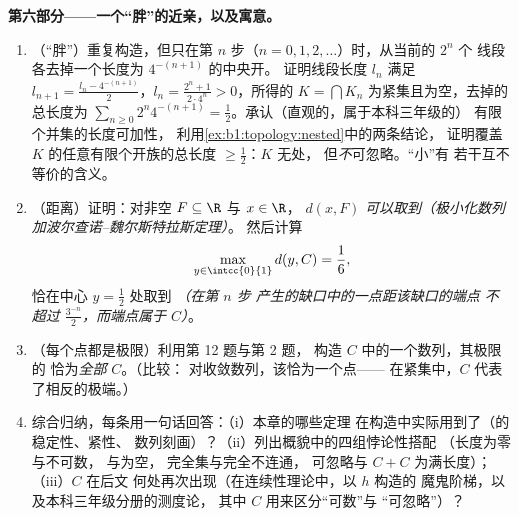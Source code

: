 \begin{problem}[{周末问题——康托尔三分集：
长度为零、不可数、完备，且 $C + C =
\intcc{0}{2}$}]
\medskip
\noindent\textbf{第六部分——一个“胖”的近亲，以及寓意。}
\begin{enumerate}[resume]
  \item （“胖”）重复构造，但只在第
        $n$ 步（$n = 0, 1, 2, \dots$）时，从当前的 $2^n$ 个
        线段各去掉一个长度为 $4^{-(n+1)}$ 的中央开。
        证明线段长度 $l_n$ 满足
        $l_{n+1} = \frac{l_n - 4^{-(n+1)}}{2}$，$l_n =
        \frac{2^n + 1}{2\cdot 4^n} > 0$，所得的
        $K = \bigcap K_n$ 为紧集且为空，去掉的总长度为
        $\sum_{n\geq0} 2^n
        4^{-(n+1)} = \frac12$。承认（直观的，属于本科三年级的）
        有限个并集的长度可加性，
        利用\cref{ex:b1:topology:nested}中的两条结论，
        证明覆盖 $K$ 的任意有限个开族的总长度
        $\geq \frac12$：$K$ 无处，
        但\emph{不}可忽略。“小”有
        若干互不等价的含义。
  \item （距离）证明：对非空 $F \subseteq
        \R$ 与 $x \in \R$， $d(x, F)$
        \emph{可以取到}\emph{（极小化数列加波尔查诺--魏尔斯特拉斯定理）}。
        然后计算
        \[
        \max_{y \in \intcc{0}{1}} d(y, C) = \frac16 ,
        \]
        恰在中心 $y = \frac12$ 处取到 \emph{（在第 $n$ 步
        产生的缺口中的一点距该缺口的端点
        不超过 $\frac{3^{-n}}{2}$，而端点属于
        $C$）}。
  \item （每个点都是极限）利用第 12 题与第 2 题，
        构造 $C$ 中的一个数列，其极限的
        恰为\emph{全部} $C$。（比较：
        对收敛数列，该恰为一个点——
        在紧集中，$C$ 代表了相反的极端。）
  \item 综合归纳，每条用一句话回答：（i）本章的哪些定理
        在构造中实际用到了（的稳定性、紧性、
        数列刻画）？（ii）列出概貌中的四组悖论性搭配
        （长度为零与不可数，
        与为空，
        完全集与完全不连通，
        可忽略与 $C+C$ 为满长度）；（iii）$C$ 在后文
        何处再次出现（在连续性理论中，以 $h$ 构造的
        魔鬼阶梯，以及本科三年级分册的测度论，
        其中 $C$ 用来区分“可数”与
        “可忽略”）？
\end{enumerate}
\end{problem}
